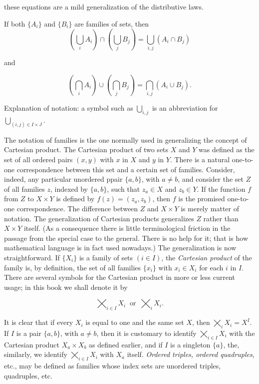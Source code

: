 these equations are a mild generalization of the distributive laws.

\begin{named}[EXERCISE. ] If both $\{ A_{i} \}$ and $\{ B_{i} \}$ are families of sets, then 
\begin{equation*}
(\bigcup_{i}A_{i}) \cap (\bigcup_{j}B_{j}) = \bigcup_{i,j}(A_{i} \cap B_{j}) 
\end{equation*}

and

\begin{equation*}
(\bigcap_{i}A_{i}) \cup (\bigcap_{j}B_{j}) = \bigcap_{i,j}(A_{i} \cup B_{j}). 
\end{equation*}
\end{named}

Explanation of notation: a symbol such as $\bigcup_{i,j}$ is an abbreviation for $\bigcup_{(i,j) \in I \times J}$.

The notation of families is the one normally used in generalizing the concept of Cartesian product. The Cartesian product of two sets $X$ and $Y$ was defined as the set of all ordered pairs $(x, y)$ with $x$ in $X$ and $y$ in $Y$. There is a natural one-to-one correspondence between this set and a certain set of families. Consider, indeed, any  particular unordered ppair $\{ a,b \}$, with $a \neq b$, and consider the set $Z$ of all families $z$, indexed by $\{ a,b \}$, such that $ z_{a} \in X$ and $z_{b} \in Y$. If the function $f$ from $Z$ to $X \times Y$ is defined by $f(z) = (z_{a}, z_{b})$, then $f$ is the promised one-to-one correspondence. The difference between $Z$ and $X \times Y$ is merely matter of notation. The generalization of Cartesian products generalizes $Z$ rather than $X \times Y$ itself. (As a consequence there is little terminological friction in the passage from the special case to the general. There is no help for it; that is how mathematical language is in fact used nowadays.) The generalization is now straightforward. If $\{ X_{i} \}$ is a family of sets $(i \in I)$, the \textit{Cartesian product} of the family is, by definition, the set of all families $\{ x_{i} \}$ with $x_{i} \in X_{i}$ for each $i$ in $I$. There are several symbols for the Cartesian product in more or less current usage; in this book we shall denote it by 

\begin{equation*}
\bigtimes_{i \in I}X_{i} \: \text{ or } \: \bigtimes_{i}X_{i}.
\end{equation*}

It is clear that if every $X_{i}$ is equal to one and the same set $X$, then $\bigtimes_{i}X_{i} = X^{I}$. If $I$ is a pair $\{ a,b \}$, with $a \neq b$, then it is customary to identify $\bigtimes_{i \in I}X_{i}$ with the Cartesian product $X_{a} \times X_{b}$ as defined earlier, and if $I$ is a singleton $\{ a \}$, the, similarly, we identify $\bigtimes_{i \in I}X_{i}$ with $X_{a}$ itself. \textit{Ordered triples, ordered quadruples}, etc., may be defined as families whose index sets are unordered triples, quadruples, etc. 

